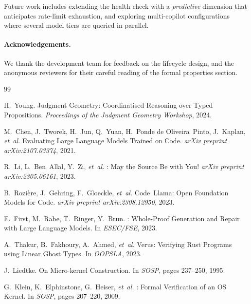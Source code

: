 \documentclass[11pt]{article}
\begin{document}
Future work includes extending the health check with a
\emph{predictive} dimension that anticipates rate-limit exhaustion,
and exploring multi-copilot configurations where several model
tiers are queried in parallel.

\paragraph{Acknowledgements.}
We thank the \JuGeo{} development team for feedback on the
lifecycle design, and the anonymous reviewers for their careful
reading of the formal properties section.

\begin{thebibliography}{99}

H.~Young.
\newblock Judgment Geometry: Coordinatised Reasoning over Typed
  Propositions.
\newblock \emph{Proceedings of the Judgment Geometry Workshop}, 2024.

M.~Chen, J.~Tworek, H.~Jun, Q.~Yuan, H.~Ponde de Oliveira~Pinto,
  J.~Kaplan, \emph{et~al.}
\newblock Evaluating Large Language Models Trained on Code.
\newblock \emph{arXiv preprint arXiv:2107.03374}, 2021.

R.~Li, L.~Ben~Allal, Y.~Zi, \emph{et~al.}
: May the Source Be with You!
\newblock \emph{arXiv preprint arXiv:2305.06161}, 2023.

B.~Rozi\`ere, J.~Gehring, F.~Gloeckle, \emph{et~al.}
\newblock Code~{Llama}: Open Foundation Models for Code.
\newblock \emph{arXiv preprint arXiv:2308.12950}, 2023.

E.~First, M.~Rabe, T.~Ringer, Y.~Brun.
: Whole-Proof Generation and Repair with Large
  Language Models.
\newblock In \emph{ESEC/FSE}, 2023.

A.~Thakur, B.~Fakhoury, A.~Ahmed, \emph{et~al.}
\newblock Verus: Verifying {Rust} Programs using Linear Ghost Types.
\newblock In \emph{OOPSLA}, 2023.

J.~Liedtke.
\newblock On Micro-kernel Construction.
\newblock In \emph{SOSP}, pages 237--250, 1995.

G.~Klein, K.~Elphinstone, G.~Heiser, \emph{et~al.}
: Formal Verification of an {OS} Kernel.
\newblock In \emph{SOSP}, pages 207--220, 2009.


\end{thebibliography}
\end{document}
